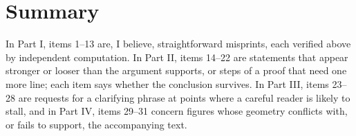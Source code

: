 \documentclass[12pt,a4paper]{article}
\begin{document}
\section*{Summary}

\noindent
In Part I, items 1--13 are, I believe, straightforward misprints, each
verified above by independent computation. In Part II, items 14--22 are
statements that appear stronger or looser than the argument supports,
or steps of a proof that need one more line; each item says whether
the conclusion survives. In Part III, items 23--28 are requests for a
clarifying phrase at points where a careful reader is likely to stall,
and in Part IV, items 29--31 concern figures whose geometry conflicts with,
or fails to support, the accompanying text.
\end{document}
